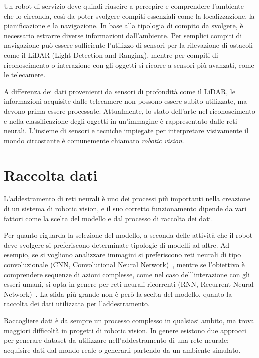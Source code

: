 \documentclass[12pt]{report}
\begin{document}
Un robot di servizio deve quindi riuscire a percepire e comprendere l'ambiente che lo circonda, così da poter svolgere compiti essenziali come la localizzazione, la pianificazione e la navigazione. In base alla tipologia di compito da svolgere, è necessario estrarre diverse informazioni dall'ambiente. Per semplici compiti di navigazione può essere sufficiente l'utilizzo di sensori per la rilevazione di ostacoli come il LiDAR (Light Detection and Ranging), mentre per compiti di riconoscimento o interazione con gli oggetti si ricorre a sensori più avanzati, come le telecamere.

A differenza dei dati provenienti da sensori di profondità come il LiDAR, le informazioni acquisite dalle telecamere non possono essere subito utilizzate, ma devono prima essere processate. Attualmente, lo stato dell'arte nel riconoscimento e nella classificazione degli oggetti in un'immagine è rappresentato dalle reti neurali. L'insieme di sensori e tecniche impiegate per interpretare visivamente il mondo circostante è comunemente chiamato \textit{robotic vision}.

\section{Raccolta dati}
\label{sec:raccolta_dati}

L'addestramento di reti neurali è uno dei processi più importanti nella creazione di un sistema di robotic vision, e il suo corretto funzionamento dipende da vari fattori come la scelta del modello e dal processo di raccolta dei dati.

Per quanto riguarda la selezione del modello, a seconda delle attività che il robot deve svolgere si preferiscono determinate tipologie di modelli ad altre. Ad esempio, se si vogliono analizzare immagini si preferiscono reti neurali di tipo convoluzionale (CNN, Convolutional Neural Network)~\cite{oshea2015introductionconvolutionalneuralnetworks}, mentre se l'obiettivo è comprendere sequenze di azioni complesse, come nel caso dell'interazione con gli esseri umani, si opta in genere per reti neurali ricorrenti (RNN, Recurrent Neural Network)~\cite{ZHANG20209}. La sfida più grande non è però la scelta del modello, quanto la raccolta dei dati utilizzata per l'addestramento.

Raccogliere dati è da sempre un processo complesso in qualsiasi ambito, ma trova maggiori difficoltà in progetti di robotic vision. In genere esistono due approcci per generare dataset da utilizzare nell'addestramento di una rete neurale: acquisire dati dal mondo reale o generarli partendo da un ambiente simulato.
\end{document}
